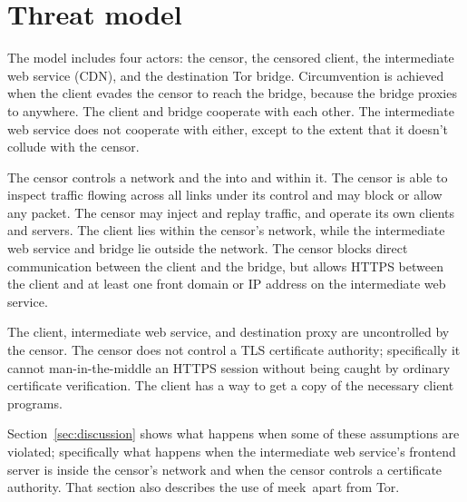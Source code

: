 \documentclass[conference]{IEEEtran}
\def\meek{meek}
\begin{document}


\section{Threat model}

The model includes four actors:
the censor,
the censored client,
the intermediate web service (CDN),
and the destination Tor bridge.
Circumvention is achieved when the client evades the censor to reach
the bridge,
because the bridge proxies to anywhere.
The client and bridge cooperate with each other.
The intermediate web service does not cooperate with either,
except to the extent that it doesn't collude with the censor.

The censor controls a network and the into and within it.
The censor is able to inspect traffic flowing across all links under its control
and may block or allow any packet.
The censor may inject and replay traffic, and
operate its own clients and servers.
The client lies within the censor's network,
while the intermediate web service and bridge lie outside the network.
The censor blocks direct communication between the client and the bridge,
but allows HTTPS between the client and at least one front domain or IP address
on the intermediate web service.


The client,
intermediate web service,
and destination proxy
are uncontrolled by the censor.
The censor does not control a TLS certificate authority;
specifically it cannot man-in-the-middle an HTTPS session
without being caught by ordinary certificate verification.
The client has a way to get a copy of the necessary client programs.

Section~\ref{sec:discussion} shows what happens when some
of these assumptions are violated;
specifically what happens
when the intermediate web service's frontend server is inside the censor's network
and when the censor controls a certificate authority.
That section also describes the use of \meek\ apart from Tor.
\end{document}
